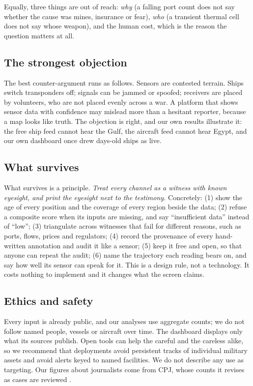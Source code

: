 \documentclass[10pt,twocolumn,letterpaper]{article}
\begin{document}
Equally, three things are out of reach: \emph{why} (a falling port count does not say whether the cause was mines, insurance or fear), \emph{who} (a transient thermal cell does not say whose weapon), and the human cost, which is the reason the question matters at all.

\subsection{The strongest objection}
The best counter-argument runs as follows. Sensors are contested terrain. Ships switch transponders off; signals can be jammed or spoofed; receivers are placed by volunteers, who are not placed evenly across a war. A platform that shows sensor data with confidence may mislead more than a hesitant reporter, because a map looks like truth. The objection is right, and our own results illustrate it: the free ship feed cannot hear the Gulf, the aircraft feed cannot hear Egypt, and our own dashboard once drew days-old ships as live.

\subsection{What survives}
What survives is a principle. \emph{Treat every channel as a witness with known eyesight, and print the eyesight next to the testimony.} Concretely: (1) show the age of every position and the coverage of every region beside the data; (2) refuse a composite score when its inputs are missing, and say ``insufficient data'' instead of ``low''; (3) triangulate across witnesses that fail for different reasons, such as ports, flows, prices and regulators; (4) record the provenance of every hand-written annotation and audit it like a sensor; (5) keep it free and open, so that anyone can repeat the audit; (6) name the trajectory each reading bears on, and say how well its sensor can speak for it. This is a design rule, not a technology. It costs nothing to implement and it changes what the screen claims.

\subsection{Ethics and safety}
Every input is already public, and our analyses use aggregate counts; we do not follow named people, vessels or aircraft over time. The dashboard displays only what its sources publish. Open tools can help the careful and the careless alike, so we recommend that deployments avoid persistent tracks of individual military assets and avoid alerts keyed to named facilities. We do not describe any use as targeting. Our figures about journalists come from CPJ, whose counts it revises as cases are reviewed \citep{cpj2026report,cpj2025report}.
\end{document}
